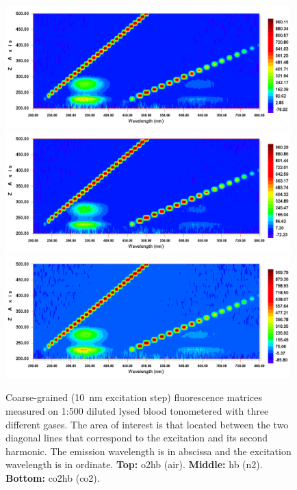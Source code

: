 \begin{figure}
	\centering
	\includegraphics[width=0.98\textwidth]{1_main_matter/co2hb_figures/fluorescence_matrices/coarse/o2.png}
	\includegraphics[width=0.98\textwidth]{1_main_matter/co2hb_figures/fluorescence_matrices/coarse/n2.png}
	\includegraphics[width=0.98\textwidth]{1_main_matter/co2hb_figures/fluorescence_matrices/coarse/co2.png}
	\caption[Coarse-grained haemoglobin fluorescence matrices.]{Coarse-grained (10~nm excitation step) fluorescence matrices measured on 1:500 diluted lysed blood tonometered with three different gases. The area of interest is that located between the two diagonal lines that correspond to the excitation and its second harmonic. The emission wavelength is in abscissa and the excitation wavelength is in ordinate. \textbf{Top:} \gls{o2hb} (air). \textbf{Middle:} \gls{hb} (\gls{n2}). \textbf{Bottom:} \gls{co2hb} (\gls{co2}).}
	\label{fig:co2hb:fluo_matrix_coarse}
\end{figure}

